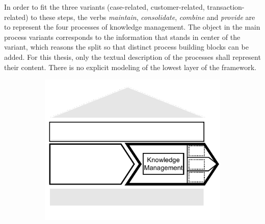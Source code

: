 In order to fit the three variants (case-related, customer-related, transaction-related) to these steps, the verbs \textit{maintain}, \textit{consolidate}, \textit{combine} and \textit{provide} are to represent the four processes of knowledge management. The object in the main process variants corresponds to the information that stands in center of the variant, which reasons the split so that distinct process building blocks can be added. For this thesis, only the textual description of the processes shall represent their content. There is no explicit modeling of the lowest layer of the framework. 

\begin{figure}[caption={Knowlege Management main process variants}, label={fig:knowledge}]
	\begin{subfigure}[b]{.6\textwidth}
		\begin{center}
			\includegraphics{figures/processes/knowledgemanagement.pdf}
		\end{center}
	\end{subfigure}

	\begin{subfigure}[b]{.32\textwidth}
		\begin{center}
\end{center}
\end{subfigure}
\end{figure}
